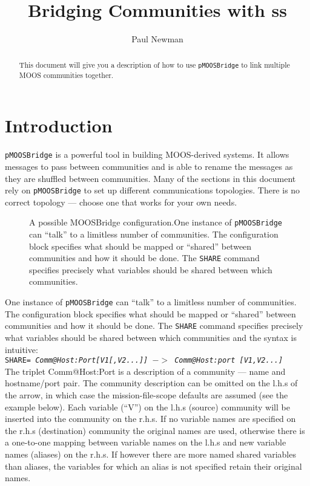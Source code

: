 \documentclass[a4paper,10pt]{article}
\title{Bridging Communities with \code{pMOOSBridge}ss}
\author{Paul Newman}
\newcommand{\Code}[1]{\texttt{#1} }
\newcommand{\code}[1]{\Code{#1} }
\begin{document}
\maketitle

\begin{center}
\end{center}
\begin{abstract}
This document will give you a description of how to use \code{pMOOSBridge} to link multiple MOOS communities together.
\end{abstract}

\section{Introduction}

\code{pMOOSBridge} is a powerful tool in building MOOS-derived
systems. It allows messages to pass between communities and is
able to rename the messages as they are shuffled between
communities. Many of the sections in this document rely on
\code{pMOOSBridge} to set up different communications topologies. There is no correct topology --- choose one that
works for your own needs.
\begin{figure}[ht]
\centering {}
\caption{A possible MOOSBridge
configuration.One instance of \code{pMOOSBridge} can ``talk'' to a limitless
number of communities. The configuration block specifies what
should be mapped or ``shared'' between communities and how it
should be done. The \code{SHARE} command specifies precisely what
variables should be shared between which communities.}\label{fig:MOOSBridge1}
\end{figure}
One instance of \code{pMOOSBridge} can ``talk'' to a limitless
number of communities. The configuration block specifies what
should be mapped or ``shared'' between communities and how it
should be done. The \code{SHARE} command specifies precisely what
variables should be shared between which communities and the
syntax is intuitive:\\

\code{SHARE= {\it{Comm@Host:Port[V1[,V2...]] $->$ Comm@Host:port
[V1,V2...]}}}\\

The triplet Comm@Host:Port is a description of a community ---  name and hostname/port pair. The community
description can be omitted on the l.h.s of the arrow, in which case the mission-file-scope defaults are assumed (see the example below).
Each variable (``V'') on the l.h.s (source) community will be inserted into the community on the r.h.s.
If no variable names are specified on the r.h.s (destination) community the original names are used, otherwise
there is a one-to-one mapping between variable names on the l.h.s and new variable names (aliases) on the r.h.s. If however
there are more named shared variables than aliases, the variables for which an alias is not specified retain their original names.
\end{document}
